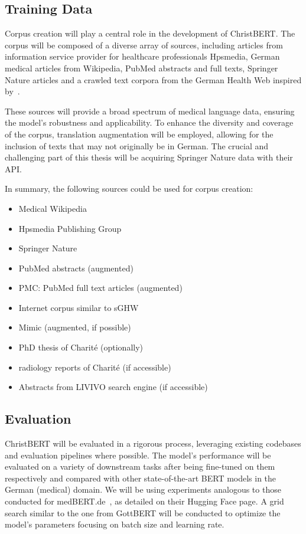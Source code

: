 \subsection*{Training Data}

Corpus creation will play a central role in the development of ChristBERT. The
corpus will be composed of a diverse array of sources, including articles from
information service provider for healthcare professionals Hpsmedia, German
medical articles from Wikipedia, PubMed abstracts and full texts, Springer
Nature articles and a crawled text corpora from the German Health Web inspired
by~\cite{zowalla2020crawling}. 

These sources will provide a broad spectrum of medical language data, ensuring
the model's robustness and applicability. To enhance the diversity and coverage
of the corpus, translation augmentation will be employed, allowing for the
inclusion of texts that may not originally be in German. The crucial and
challenging part of this thesis will be acquiring Springer Nature data with
their API.

In summary, the following sources could be used for corpus creation:

\begin{itemize}
    \item Medical Wikipedia
    \item Hpsmedia Publishing Group
    \item Springer Nature
    \item PubMed abstracts (augmented)
    \item PMC: PubMed full text articles (augmented)
    \item Internet corpus similar to sGHW~\cite{zowalla2020crawling}
    \item Mimic (augmented, if possible)
    \item PhD thesis of Charité (optionally)
    \item radiology reports of Charité (if accessible)
    \item Abstracts from LIVIVO search engine (if accessible)
\end{itemize}

\subsection*{Evaluation}

ChristBERT will be evaluated in a rigorous process, leveraging existing
codebases and evaluation pipelines where possible. The model's performance will
be evaluated on a variety of downstream tasks after being fine-tuned on them
respectively and compared with other state-of-the-art BERT models in the German
(medical) domain. We will be using experiments analogous to those conducted for
medBERT.de~\cite{bressem2024medbert}, as detailed on their Hugging Face page. A
grid search similar to the one from GottBERT will be conducted to optimize the
model's parameters focusing on batch size and learning rate. 

